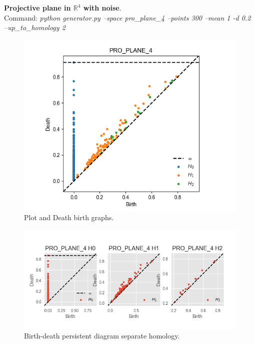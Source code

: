 \documentclass[11pt,a4paper]{report}
\begin{document}
             \textbf{Projective plane in $\mathbb{R}^4$ with noise}.\\
              Command: \textit{python generator.py --space pro\_plane\_4 --points 300 --mean 1 -d 0.2 --up\_to\_homology 2}

              \begin{figure}[H]
                \centering
                \includegraphics[width=\linewidth]{./ripser/pro_plane_homology.png}
                \caption{Plot and Death birth graphs.}
                \label{fig:sep hom}
              \end{figure}

              \begin{figure}[H]
                \centering
                \includegraphics[width=\linewidth]{./ripser/pro_plane_sep.png}
                \caption{Birth-death persistent diagram separate homology.}
                \label{fig:sep hom}
              \end{figure}
\end{document}
